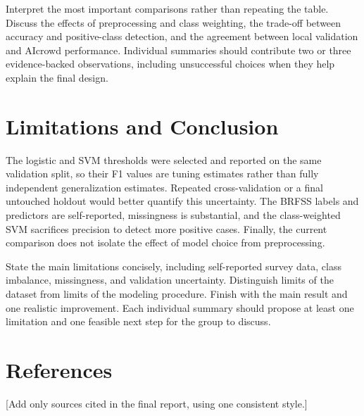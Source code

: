 \documentclass[11pt,a4paper]{article}
\newenvironment{outlinebox}
  {\begin{mdframed}[backgroundcolor=guidancebg,linecolor=guidancebg,linewidth=0pt,
    innerleftmargin=6pt,innerrightmargin=6pt,innertopmargin=5pt,innerbottommargin=5pt,
    skipabove=5pt,skipbelow=8pt]
   \setstretch{1.0}\fontsize{9.5}{11.5}\selectfont\color{guidancetext}
   \setlength{\parskip}{3pt}}
  {\end{mdframed}}
\begin{document}
\begin{outlinebox}
Interpret the most important comparisons rather than repeating the table.
Discuss the effects of preprocessing and class weighting, the trade-off between
accuracy and positive-class detection, and the agreement between local
validation and AIcrowd performance. Individual summaries should contribute two
or three evidence-backed observations, including unsuccessful choices when
they help explain the final design.
\end{outlinebox}

\section{Limitations and Conclusion}

The logistic and SVM thresholds were selected and reported on the same
validation split, so their F1 values are tuning estimates rather than fully
independent generalization estimates. Repeated cross-validation or a final
untouched holdout would better quantify this uncertainty. The BRFSS labels and
predictors are self-reported, missingness is substantial, and the class-weighted
SVM sacrifices precision to detect more positive cases. Finally, the current
comparison does not isolate the effect of model choice from preprocessing.

\begin{outlinebox}
State the main limitations concisely, including self-reported survey data,
class imbalance, missingness, and validation uncertainty. Distinguish limits
of the dataset from limits of the modeling procedure. Finish with the main
result and one realistic improvement. Each individual summary should propose
at least one limitation and one feasible next step for the group to discuss.
\end{outlinebox}

\section*{References}

[Add only sources cited in the final report, using one consistent style.]
\end{document}
